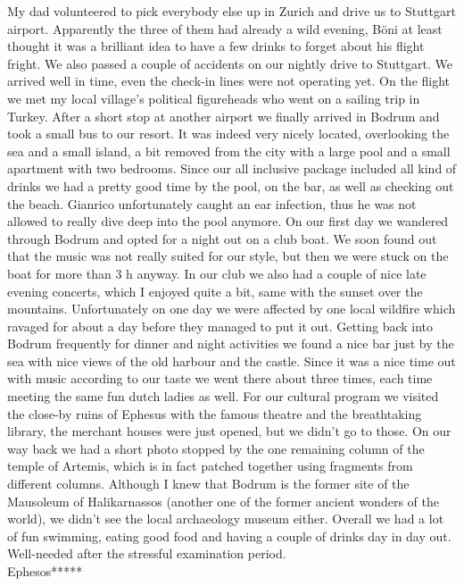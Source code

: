 My dad volunteered to pick everybody else up in Zurich and drive us to Stuttgart airport. Apparently the three of them had already a wild evening, B\"oni at least thought it was a brilliant idea to have a few drinks to forget about his flight fright. We also passed a couple of accidents on our nightly drive to Stuttgart. We arrived well in time, even the check-in lines were not operating yet. On the flight we met my local village's political figureheads who went on a sailing trip in Turkey. After a short stop at another airport we finally arrived in Bodrum and took a small bus to our resort. It was indeed very nicely located, overlooking the sea and a small island, a bit removed from the city with a large pool and a small apartment with two bedrooms. Since our all inclusive package included all kind of drinks we had a pretty good time by the pool, on the bar, as well as checking out the beach. Gianrico unfortunately caught an ear infection, thus he was not allowed to really dive deep into the pool anymore. On our first day we wandered through Bodrum and opted for a night out on a club boat. We soon found out that the music was not really suited for our style, but then we were stuck on the boat for more than 3 h anyway. In our club we also had a couple of nice late evening concerts, which I enjoyed quite a bit, same with the sunset over the mountains. Unfortunately on one day we were affected by one local wildfire which ravaged for about a day before they managed to put it out. Getting back into Bodrum frequently for dinner and night activities we found a nice bar just by the sea with nice views of the old harbour and the castle. Since it was a nice time out with music according to our taste we went there about three times, each time meeting the same fun dutch ladies as well. For our cultural program we visited the close-by ruins of Ephesus with the famous theatre and the breathtaking library, the merchant houses were just opened, but we didn't go to those. On our way back we had a short photo stopped by the one remaining column of the temple of Artemis, which is in fact patched together using fragments from different columns. Although I knew that Bodrum is the former site of the Mausoleum of Halikarnassos (another one of the former ancient wonders of the world), we didn't see the local archaeology museum either. Overall we had a lot of fun swimming, eating good food and having a couple of drinks day in day out. Well-needed after the stressful examination period.\\

Ephesos*****\\